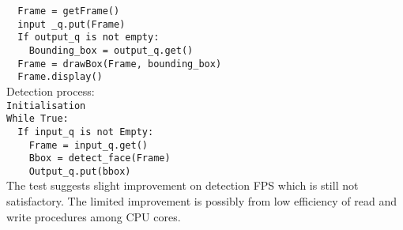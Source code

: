 \verb#  Frame = getFrame()#\\
\verb#  input _q.put(Frame)#\\[.2in]
\verb#  If output_q is not empty:#\\
\verb#    Bounding_box = output_q.get()#\\
\verb#  Frame = drawBox(Frame, bounding_box)#\\
\verb#  Frame.display()#\\[.2in]
Detection process:\\[.2in]
\verb#Initialisation#\\[.2in]
\verb#While True:#\\
\verb#  If input_q is not Empty:#\\
\verb#    Frame = input_q.get()#\\
\verb#    Bbox = detect_face(Frame)#\\
\verb#    Output_q.put(bbox)#\\[.2in]
The test suggests slight improvement on detection FPS which is still not satisfactory. The limited improvement is possibly from low efficiency of read and write procedures among CPU cores. 
